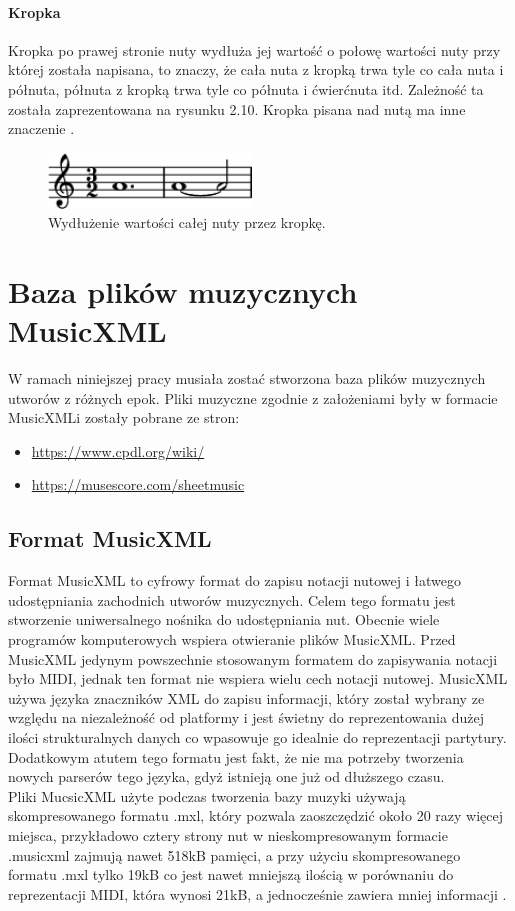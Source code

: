 \documentclass[printmode, eng, openany]{mgr}
\newcommand\tab[1][1cm]{\hspace*{#1}}
\begin{document}
\subsubsection{Kropka}
\tab Kropka po prawej stronie nuty wydłuża jej wartość o połowę wartości nuty przy której została napisana, to znaczy, że cała nuta z kropką trwa tyle co cała nuta i półnuta, półnuta z kropką trwa tyle co półnuta i ćwierćnuta itd. Zależność ta została zaprezentowana na rysunku 2.10. Kropka pisana nad nutą ma inne znaczenie \cite{wart}.

\begin{figure}[!htb]
\centering
\includegraphics[width=5.4cm]{kropka}
\caption{Wydłużenie wartości całej nuty przez kropkę.}
\end{figure}

\chapter{Baza plików muzycznych MusicXML}
\tab W ramach niniejszej pracy musiała zostać stworzona baza plików muzycznych utworów z różnych epok. Pliki muzyczne zgodnie z założeniami były w formacie MusicXML\linebreak i zostały pobrane ze stron:
\begin{itemize}
\item \url{https://www.cpdl.org/wiki/}
\item \url{https://musescore.com/sheetmusic}
\end{itemize}
\section{Format MusicXML}
\tab Format MusicXML to cyfrowy format do zapisu notacji nutowej i łatwego udostępniania zachodnich utworów muzycznych. Celem tego formatu jest stworzenie uniwersalnego nośnika do udostępniania nut. Obecnie wiele programów komputerowych wspiera otwieranie plików MusicXML. Przed MusicXML jedynym powszechnie stosowanym formatem do zapisywania notacji było MIDI, jednak ten format nie wspiera wielu cech notacji nutowej. MusicXML używa języka znaczników XML \cite{xml} do zapisu informacji, który został wybrany ze względu na niezależność od platformy i jest świetny do reprezentowania dużej ilości strukturalnych danych co wpasowuje go idealnie do reprezentacji partytury. Dodatkowym atutem tego formatu jest fakt, że nie ma potrzeby tworzenia nowych parserów tego języka, gdyż istnieją one już od dłuższego czasu.\\
\tab Pliki MucsicXML użyte podczas tworzenia bazy muzyki używają skompresowanego formatu .mxl, który pozwala zaoszczędzić około 20 razy więcej miejsca, przykładowo cztery strony nut w nieskompresowanym formacie .musicxml zajmują nawet 518kB pamięci, a przy użyciu skompresowanego formatu .mxl tylko 19kB co jest nawet mniejszą ilością w porównaniu do reprezentacji MIDI, która wynosi 21kB, a jednocześnie zawiera mniej informacji \cite{mxml}. 
\end{document}
